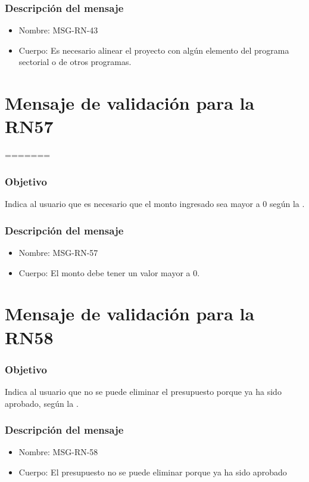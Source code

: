 \subsubsection{Descripción del mensaje}
\begin{itemize}
\item Nombre: MSG-RN-43
\item Cuerpo: Es necesario alinear el proyecto con algún elemento del programa sectorial o de otros programas.
\end{itemize}

\section{Mensaje de validación para la RN57} \label{MSG_RN57}
=======
\subsubsection{Objetivo}
Indica al usuario que es necesario que el monto ingresado sea mayor a 0 según la .

\subsubsection{Descripción del mensaje}
\begin{itemize}
\item Nombre: MSG-RN-57
\item Cuerpo: El monto debe tener un valor mayor a 0.
\end{itemize}

\section{Mensaje de validación para la RN58} \label{MSG_RN58}

\subsubsection{Objetivo}
Indica al usuario que no se puede eliminar el presupuesto porque ya ha sido aprobado,  según la .

\subsubsection{Descripción del mensaje}
\begin{itemize}
\item Nombre: MSG-RN-58
\item Cuerpo: El presupuesto no se puede eliminar porque ya ha sido aprobado
\end{itemize}


